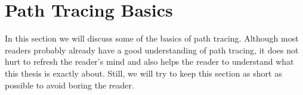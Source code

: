 \section{Path Tracing Basics}
\label{sec:preliminaries:pat}

In this section we will discuss some of the basics of path tracing. Although most readers probably already have a good understanding of path tracing, it does not hurt to refresh the reader's mind and also helps the reader to understand what this thesis is exactly about. Still, we will try to keep this section as short as possible to avoid boring the reader.

